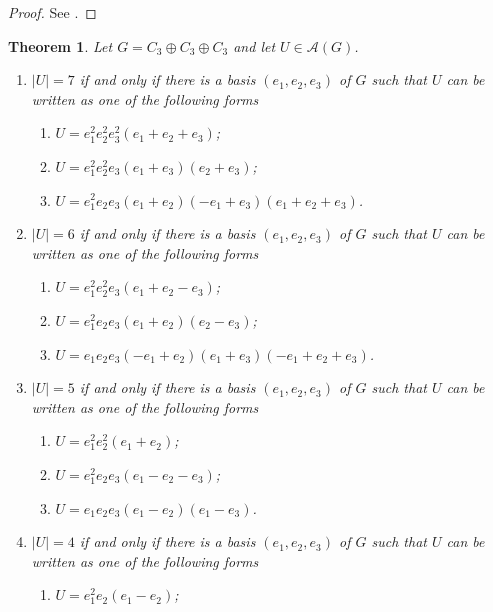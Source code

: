 \documentclass[a4paper, 10pt]{amsart}
\theoremstyle{plain}
\newtheorem{theorem}{\bf Theorem}[section]
\theoremstyle{definition}
\theoremstyle{definition}
\numberwithin{equation}{section}
\begin{document}
\begin{proof}
See \cite[Theorem 4.6.2]{Ge-Gr-Zh26a}.
\end{proof}

\medskip
\begin{theorem} \label{3.3}
Let $G = C_3 \oplus C_3 \oplus C_3$ and let $U \in \mathcal A (G)$.
\begin{enumerate}
\item $|U|=7$  if and only if there is a basis $(e_1,e_2,e_3)$ of $G$ such that $U$ can be written as one of the following forms
	  \begin{enumerate}
	  \item $U=e_1^2e_2^2e_3^2(e_1+e_2+e_3)$;
			
	  \item $U=e_1^2e_2^2e_3(e_1+e_3)(e_2+e_3)$;
			
	  \item $U=e_1^2e_2e_3(e_1+e_2)(-e_1+e_3)(e_1+e_2+e_3)$.
	  \end{enumerate}
			
\item $|U|=6$  if and only if there is a basis $(e_1,e_2,e_3)$ of $G$ such that $U$ can be written as one of the following forms
	  \begin{enumerate}
	  \item $U=e_1^2e_2^2e_3(e_1+e_2-e_3)$;
			
	  \item $U=e_1^2e_2e_3(e_1+e_2)(e_2-e_3)$;
			
	  \item $U=e_1e_2e_3(-e_1+e_2)(e_1+e_3)(-e_1+e_2+e_3)$.
	  \end{enumerate}
		
\item $|U|=5$  if and only if there is a basis $(e_1,e_2,e_3)$ of $G$ such that $U$ can be written as one of the following forms
	  \begin{enumerate}
	  \item $U=e_1^2e_2^2(e_1+e_2)$;
			
	  \item $U=e_1^2e_2e_3(e_1-e_2-e_3)$;
			
      \item $U=e_1e_2e_3(e_1-e_2)(e_1-e_3)$.
	  \end{enumerate}
		
\item $|U|=4$  if and only if there is a basis $(e_1,e_2,e_3)$ of $G$ such that $U$ can be written as one of the following forms
	  \begin{enumerate}
	  \item $U=e_1^2e_2(e_1-e_2)$;
			

\end{enumerate}
\end{enumerate}
\end{theorem}
\end{document}
